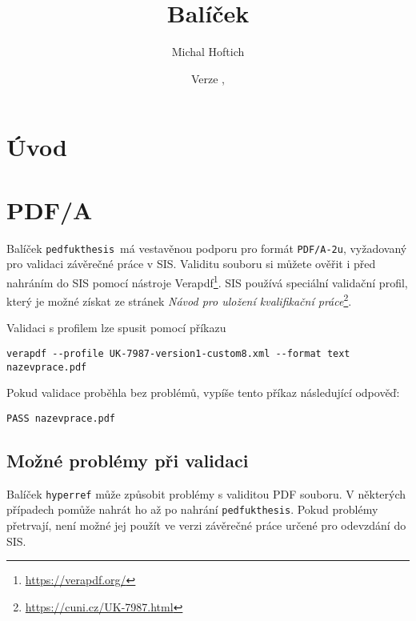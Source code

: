\documentclass{ltxdoc}
\title{Balíček \pkgname}
\author{Michal Hoftich}
\date{Verze \version, \gitdate}
\newcommand\pkgname{\texttt{pedfukthesis}}
\begin{document}
\maketitle

\tableofcontents

\section{Úvod}


\section{PDF/A}
Balíček \pkgname\ má vestavěnou podporu pro formát \texttt{PDF/A-2u},
vyžadovaný pro validaci závěrečné práce v SIS. Validitu souboru si můžete
ověřit i před nahráním do SIS pomocí nástroje
Verapdf\footnote{\url{https://verapdf.org/}}. SIS používá speciální validační
profil, který je možné získat ze stránek
\textit{Návod pro uložení kvalifikační práce}\footnote{\url{https://cuni.cz/UK-7987.html}}.

Validaci s profilem lze spusit pomocí příkazu

\begin{verbatim}
verapdf --profile UK-7987-version1-custom8.xml --format text nazevprace.pdf
\end{verbatim}

Pokud validace proběhla bez problémů, vypíše tento příkaz následující odpověď:

\begin{verbatim}
PASS nazevprace.pdf
\end{verbatim}

\subsection{Možné problémy při validaci}

Balíček \texttt{hyperref} může způsobit problémy s validitou PDF souboru. V některých případech
pomůže nahrát ho až po nahrání \pkgname. Pokud problémy přetrvají, není možné
jej použít ve verzi závěrečné práce určené pro odevzdání do SIS.
\end{document}
